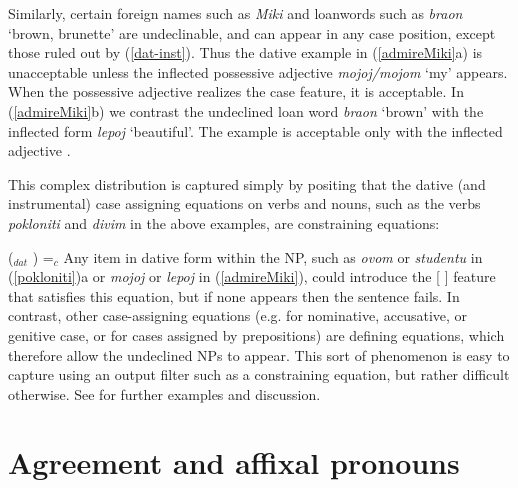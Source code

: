 \noindent
Similarly, certain foreign names such as \textit{Miki} and loanwords such as {\it braon} `brown, brunette' are undeclinable, and can appear in any case position, except those ruled out by (\ref{dat-inst}).  Thus the
dative example in (\ref{admireMiki}a) is unacceptable unless the inflected possessive
adjective {\it mojoj/mojom} `my'  appears.   When the possessive adjective realizes the case
feature, it is acceptable.  In  (\ref{admireMiki}b) we contrast the undeclined loan word {\it
braon} `brown' with the inflected form {\it lepoj} `beautiful'.  The example is acceptable only
with the inflected adjective \citep[134]{WZ2003a}.  


\begin{exe} 
\ex	\label{admireMiki}
\begin{xlist}
\end{xlist}
\end{exe}

\noindent
This complex distribution is captured simply by positing that the dative (and instrumental) case assigning equations on verbs and nouns, such as the verbs \textit{pokloniti} and \textit{divim} in the above examples, are constraining equations:

\ea
(\up {}$_{dat}$ ) =$_c$ 
\z
Any item in dative form within the NP, such as \textit{ovom} or \textit{studentu} in (\ref{pokloniti})a or \textit{mojoj} or \textit{lepoj} in (\ref{admireMiki}), could introduce the [ ] feature that satisfies this equation, but if none appears then the sentence fails.  In contrast, other case-assigning equations (e.g. for nominative, accusative, or genitive case, or for cases assigned by prepositions) are defining equations, which therefore allow the undeclined NPs to appear.  This sort of phenomenon is easy to capture using an output filter such as a constraining equation, but rather difficult otherwise.  See \citet{wechsler2001case} for further examples and discussion.  

\section{Agreement and affixal pronouns}

